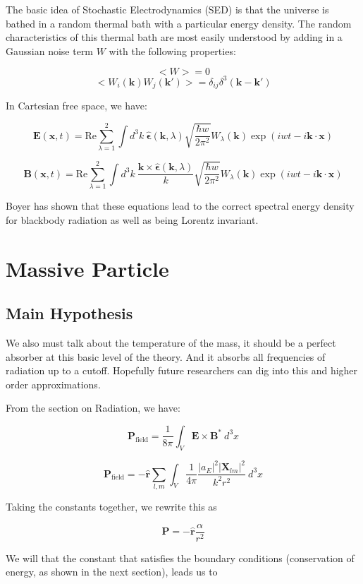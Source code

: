 \documentclass {article}
\renewcommand\vec{\mathbf}
\let\OldHat\hat
\renewcommand{\hat}[1]{\OldHat{\mathbf{#1}}}
\begin{document}
The basic idea of Stochastic Electrodynamics (SED) is that the universe is bathed in a random thermal bath with a particular energy density. The random characteristics of this thermal bath are most easily understood by adding in a Gaussian noise term $W$ with the following properties:

$$<W> = 0$$
$$<W_i (\vec k) W_j (\vec k') > = \delta_{ij} \delta^3(\vec k - \vec k')$$

In Cartesian free space, we have:

$$\vec E (\vec x ,  t) = \text {Re} \sum_{\lambda = 1}^2  \int d^3k ~ \hat \epsilon(\vec k, \lambda) \sqrt {\frac {\hbar w} {2 \pi^2}} W_{\lambda}(\vec k) \exp(iwt - i\vec k \cdot \vec x)$$

$$\vec B (\vec x ,  t) = \text {Re} \sum_{\lambda = 1}^2  \int d^3k ~ \frac {\vec k \times \hat \epsilon(\vec k, \lambda)} k \sqrt {\frac {\hbar w} {2 \pi^2}} W_{\lambda}(\vec k) \exp(iwt - i\vec k \cdot \vec x)$$


Boyer has shown that these equations lead to the correct spectral energy density for blackbody radiation as well as being Lorentz invariant.




\newpage

\section{Massive Particle}
\subsection{Main Hypothesis}

We also must talk about the temperature of the mass, it should be a perfect absorber at this basic level of the theory. And it absorbs all frequencies of radiation up to a cutoff.  Hopefully future researchers can dig into this and higher order approximations.

From the section on Radiation, we have:

$$\vec P_{\text{field}} = \frac 1 {8 \pi} \int_V \vec E \times \vec B^* ~ d^3x$$ 

$$\vec P_{\text{field}} = - \hat r \sum_{l, m}   \int_V \frac 1 {4 \pi}  \frac {|a_E|^2 |\vec X_{lm} |^2}{k^2 r^2} ~ d^3x $$


Taking the constants together, we rewrite this as 

$$\vec P  = - \hat r  \frac {\alpha}{r^2} $$

We will that the constant that satisfies the boundary conditions (conservation of energy, as shown in the next section), leads us to 
\end{document}
